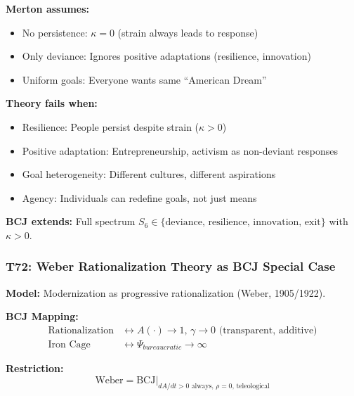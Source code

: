 \begin{tcolorbox}[colback=red!5!white, colframe=red!75!black,
    title=Boundary Condition: Where Merton Fails]
\textbf{Merton assumes:}
\begin{itemize}[nosep]
\item No persistence: $\kappa = 0$ (strain always leads to response)
\item Only deviance: Ignores positive adaptations (resilience, innovation)
\item Uniform goals: Everyone wants same ``American Dream''
\end{itemize}

\textbf{Theory fails when:}
\begin{itemize}[nosep]
\item Resilience: People persist despite strain ($\kappa > 0$)
\item Positive adaptation: Entrepreneurship, activism as non-deviant responses
\item Goal heterogeneity: Different cultures, different aspirations
\item Agency: Individuals can redefine goals, not just means
\end{itemize}

\textbf{BCJ extends:} Full spectrum $S_6 \in \{\text{deviance, resilience, innovation, exit}\}$ with $\kappa > 0$.
\end{tcolorbox}

\subsubsection*{T72: Weber Rationalization Theory as BCJ Special Case}

\textbf{Model:} Modernization as progressive rationalization (Weber, 1905/1922).

\textbf{BCJ Mapping:}
\begin{align}
\text{Rationalization} &\leftrightarrow A(\cdot) \to 1, \, \gamma \to 0 \text{ (transparent, additive)} \\
\text{Iron Cage} &\leftrightarrow \Psi_{bureaucratic} \to \infty
\end{align}

\textbf{Restriction:}
\begin{equation}
\text{Weber} = \text{BCJ} \big|_{dA/dt > 0 \text{ always}, \, \rho = 0, \, \text{teleological}}
\end{equation}

